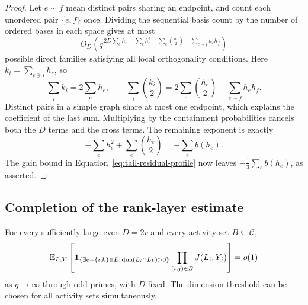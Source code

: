 \begin{proof}
Let $e\sim f$ mean distinct pairs sharing an endpoint, and count each
unordered pair $\{e,f\}$ once.  Dividing the sequential basis count
by the number of ordered bases in each space gives at most
\[
 O_D\left(q^{\,2D\sum_eh_e-\sum_eh_e^2
 -\sum_e\binom{h_e}{2}-\sum_{e\sim f}h_eh_f}\right)
\]
possible direct families satisfying all local orthogonality conditions.
Here $k_i=\sum_{e\ni i}h_e$, so
\[
 \sum_i k_i=2\sum_eh_e,
 \qquad
 \sum_i\binom{k_i}{2}
 =2\sum_e\binom{h_e}{2}+\sum_{e\sim f}h_eh_f.
\]
Distinct pairs in a simple graph share at most one endpoint, which
explains the coefficient of the last sum.  Multiplying by the
containment probabilities cancels both the $D$ terms and the cross
terms.  The remaining exponent is exactly
\[
 -\sum_eh_e^2+\sum_e\binom{h_e}{2}=-\sum_e b(h_e).
\]
The gain bound in Equation~\eqref{eq:tail-residual-profile} now leaves
$-\tfrac13\sum_e b(h_e)$, as asserted.
\end{proof}

\subsection{Completion of the rank-layer estimate}

\begin{proposition}\label{prop:singular-tail}
For every sufficiently large even $D=2r$ and every activity set
$B\subseteq\mathscr C$,
\begin{equation}\label{eq:tail-vanishing}
 \mathbb E_{L,Y}\left[
 \mathbf 1_{\{\exists e=\{i,k\}\in E:\,\dim(L_i\cap L_k)>0\}}
 \prod_{(i,j)\in B}J(L_i,Y_j)\right]=o(1)
\end{equation}
as $q\to\infty$ through odd primes, with $D$ fixed.  The dimension
threshold can be chosen for all activity sets simultaneously.
\end{proposition}

